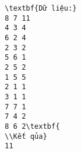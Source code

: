 \begin{verbatim}
\textbf{Dữ liệu:} 
8 7 11
4 3 4
6 2 4
2 3 2
5 6 1
2 5 2
1 5 5
2 1 1
3 1 1
7 7 1
7 4 2
8 6 2\textbf{
\\Kết qủa} 
11
\end{verbatim}